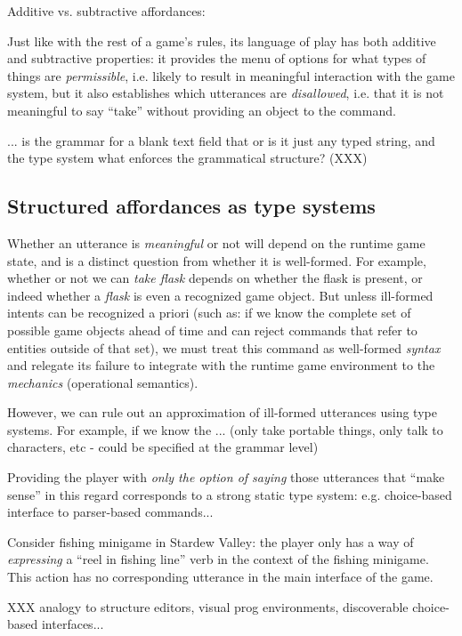   Additive vs. subtractive affordances:

  Just like with the rest of a game's rules, its language of play has both
  additive and subtractive properties: it provides the menu of options for
  what types of things are {\em permissible}, i.e. likely to result in
  meaningful interaction with the game system, but it also establishes
  which utterances are {\em disallowed}, i.e. that it is not meaningful to
  say ``take'' without providing an object to the command.

  ... is the grammar for a blank text field that or is it just any typed
  string, and the type system what enforces the grammatical structure?
  (XXX)

  \subsection{Structured affordances as type systems}
  
  Whether an utterance is {\em meaningful} or not will depend on
  the runtime game state, and is a distinct question from whether it is
  well-formed. For example, whether or not we can {\em take
  flask} depends on whether the flask is present, or indeed whether a {\em
  flask} is even a recognized game object. But unless ill-formed intents can be
  recognized a priori (such as: if we know the complete set of possible
  game objects ahead of time and can reject commands that refer to entities
  outside of that set), we must treat this command as well-formed {\em
  syntax} and relegate its failure to integrate with the runtime game
  environment to the {\em mechanics} (operational semantics).

  However, we can rule out an approximation of ill-formed utterances using
  type systems. For example, if we know the ...
  (only take portable things, only talk to characters, etc - could be
  specified at the grammar level)
  
  Providing the player with {\em only the option of saying} those
  utterances that ``make sense'' in this regard corresponds to a strong
  static type system: e.g. choice-based interface to parser-based
  commands...

  Consider fishing minigame in Stardew Valley: the player only has a way of
  {\em expressing} a ``reel in fishing line'' verb in the context of the
  fishing minigame. This action has no corresponding utterance in the main
  interface of the game.

  XXX analogy to structure editors, visual prog environments, discoverable
  choice-based interfaces...


